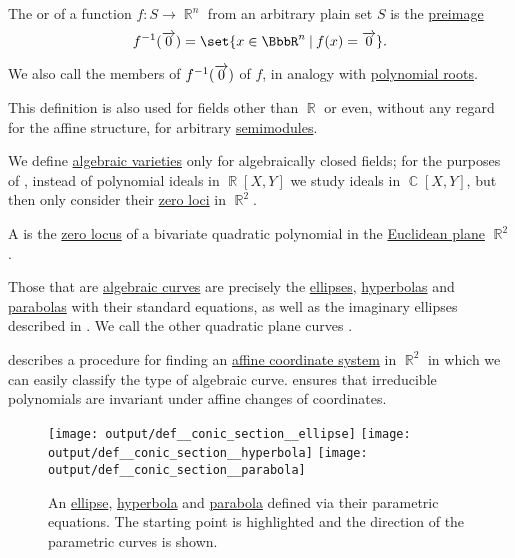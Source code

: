 \begin{definition}\label{def:zero_locus}\mimprovised
  The  or  of a function \( f: S \to \BbbR^n \) from an arbitrary plain set \( S \) is the \hyperref[def:set_valued_map/inverse]{preimage}
  \begin{equation*}
    f^{-1}(\vect 0) = \set{ x \in \BbbR^n \given f(x) = \vect 0 }.
  \end{equation*}

  We also call the members of \( f^{-1}(\overrightarrow{0}) \)  of \( f \), in analogy with \hyperref[def:polynomial_root]{polynomial roots}.

  This definition is also used for fields other than \( \BbbR \) or even, without any regard for the affine structure, for arbitrary \hyperref[def:semimodule]{semimodules}.
\end{definition}

\begin{remark}\label{rem:real_affine_varieties}
  We define \hyperref[def:affine_algebraic_set/variety]{algebraic varieties} only for algebraically closed fields; for the purposes of , instead of polynomial ideals in \( \BbbR[X, Y] \) we study ideals in \( \BbbC[X, Y] \), but then only consider their \hyperref[def:zero_locus]{zero loci} in \( \BbbR^2 \).
\end{remark}

\begin{definition}\label{def:quadratic_plane_curve}\mimprovised
  A  is the \hyperref[def:zero_locus]{zero locus} of a bivariate quadratic polynomial in the \hyperref[def:euclidean_plane]{Euclidean plane} \( \BbbR^2 \).

  Those that are \hyperref[def:affine_algebraic_set/curve]{algebraic curves} are precisely the \hyperref[def:ellipse]{ellipses}, \hyperref[def:hyperbola]{hyperbolas} and \hyperref[def:parabola]{parabolas} with their standard equations, as well as the imaginary ellipses described in . We call the other quadratic plane curves .

   describes a procedure for finding an \hyperref[def:affine_coordinate_system]{affine coordinate system} in \( \BbbR^2 \) in which we can easily classify the type of algebraic curve.  ensures that irreducible polynomials are invariant under affine changes of coordinates.

  \begin{figure}[!ht]
    \hfill
    \hfill
    \texttt{[image: output/def\_\_conic\_section\_\_ellipse]}
    \hfill
    \texttt{[image: output/def\_\_conic\_section\_\_hyperbola]}
    \hfill
    \texttt{[image: output/def\_\_conic\_section\_\_parabola]}
    \hfill
    \caption{An \hyperref[def:ellipse]{ellipse}, \hyperref[def:hyperbola]{hyperbola} and \hyperref[def:parabola]{parabola} defined via their parametric equations. The starting point is highlighted and the direction of the parametric curves is shown.}\label{fig:def:quadratic_plane_curve}
  \end{figure}
\end{definition}

